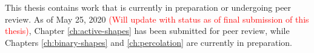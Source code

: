 
This thesis contains work that is currently in preparation or undergoing peer review. As of May 25, 2020 \textcolor{red}{(Will update with status as of final submission of this thesis)}, Chapter \ref{ch:active-shapes} has been submitted for peer review, while Chapters \ref{ch:binary-shapes} and \ref{ch:percolation} are currently in preparation.
